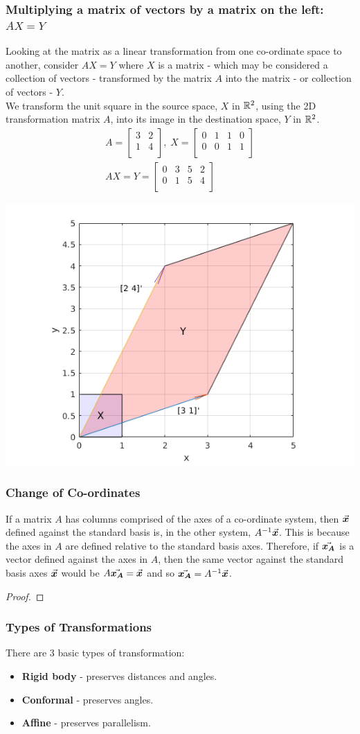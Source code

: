 \documentclass[MathsNotesBase.tex]{subfiles}
\newcommand{\exampleMatrixTwoDTransform}{
We transform the unit square in the source space, $X$ in $\R{2}$, using the 2D transformation matrix $A$, into its image in the destination space, $Y$ in $\R{2}$.
	\begin{align*}
	A =
	\begin{bmatrix}    
	3  &   2 \\
	1  &   4 \\		
	\end{bmatrix}
	,\; X = 
	\begin{bmatrix}  
	0   &  1  &   1  &   0 \\
	0   &  0  &   1  &   1	\\	
	\end{bmatrix} \\[10pt]
	AX = Y = 
	\begin{bmatrix}   
	0  &   3  &   5  &   2 \\
	0  &   1  &   5  &   4	\\
	\end{bmatrix}
	\end{align*}
	
	\begin{center}
	\includegraphics[scale=0.85]{resources/img/GeometryOfMatrices_images/linear_transformation.png}
	\end{center}
}
\begin{document}
{		\subsubsection{Multiplying a matrix of vectors by a matrix on the left: \texorpdfstring{$ AX = Y $}{AX = Y}}
		Looking at the matrix as a linear transformation from one co-ordinate space to another, consider $AX = Y$ where $X$ is a matrix - which may be considered a collection of vectors - transformed by the matrix $A$ into the matrix - or collection of vectors - $Y$.\\
					
		\exampleMatrixTwoDTransform
		
		\bigskip
		\subsubsection{Change of Co-ordinates}
		If a matrix $A$ has columns comprised of the axes of a co-ordinate system, then $\vec{\bm{x}}$ defined against the standard basis is, in the other system, ${ {A}^{-1}\vec{\bm{x}} }$. This is because the axes in $A$ are defined relative to the standard basis axes. Therefore, if $\vec{\bm{x_A}}$ is a vector defined against the axes in $A$, then the same vector against the standard basis axes $\vec{\bm{x}}$ would be ${ A\vec{\bm{x_A}} = \vec{\bm{x}} }$ and so ${ \vec{\bm{x_A}} = {A}^{-1}\vec{\bm{x}} }$.
		
		\medskip
		\begin{proof}
		\end{proof}
		
		\bigskip
		\subsubsection{Types of Transformations}
		There are 3 basic types of transformation:
		\begin{itemize}
		\item{\textbf{Rigid body} - preserves distances and angles.
		}
		\item{\textbf{Conformal} - preserves angles.
		}
		\item{\textbf{Affine} - preserves parallelism.
		}
		\end{itemize}
		
}
\end{document}
